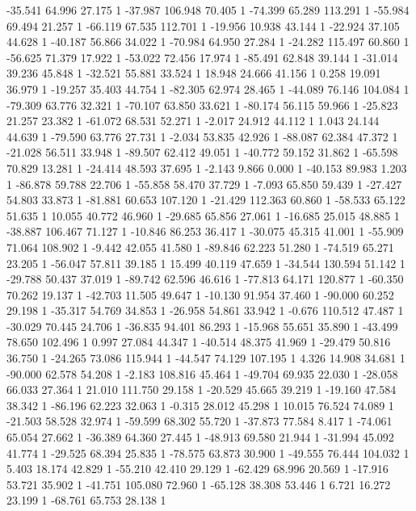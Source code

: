 	-35.541 64.996 27.175 1
	-37.987 106.948 70.405 1
	-74.399 65.289 113.291 1
	-55.984 69.494 21.257 1
	-66.119 67.535 112.701 1
	-19.956 10.938 43.144 1
	-22.924 37.105 44.628 1
	-40.187 56.866 34.022 1
	-70.984 64.950 27.284 1
	-24.282 115.497 60.860 1
	-56.625 71.379 17.922 1
	-53.022 72.456 17.974 1
	-85.491 62.848 39.144 1
	-31.014 39.236 45.848 1
	-32.521 55.881 33.524 1
	18.948 24.666 41.156 1
	0.258 19.091 36.979 1
	-19.257 35.403 44.754 1
	-82.305 62.974 28.465 1
	-44.089 76.146 104.084 1
	-79.309 63.776 32.321 1
	-70.107 63.850 33.621 1
	-80.174 56.115 59.966 1
	-25.823 21.257 23.382 1
	-61.072 68.531 52.271 1
	-2.017 24.912 44.112 1
	1.043 24.144 44.639 1
	-79.590 63.776 27.731 1
	-2.034 53.835 42.926 1
	-88.087 62.384 47.372 1
	-21.028 56.511 33.948 1
	-89.507 62.412 49.051 1
	-40.772 59.152 31.862 1
	-65.598 70.829 13.281 1
	-24.414 48.593 37.695 1
	-2.143 9.866 0.000 1
	-40.153 89.983 1.203 1
	-86.878 59.788 22.706 1
	-55.858 58.470 37.729 1
	-7.093 65.850 59.439 1
	-27.427 54.803 33.873 1
	-81.881 60.653 107.120 1
	-21.429 112.363 60.860 1
	-58.533 65.122 51.635 1
	10.055 40.772 46.960 1
	-29.685 65.856 27.061 1
	-16.685 25.015 48.885 1
	-38.887 106.467 71.127 1
	-10.846 86.253 36.417 1
	-30.075 45.315 41.001 1
	-55.909 71.064 108.902 1
	-9.442 42.055 41.580 1
	-89.846 62.223 51.280 1
	-74.519 65.271 23.205 1
	-56.047 57.811 39.185 1
	15.499 40.119 47.659 1
	-34.544 130.594 51.142 1
	-29.788 50.437 37.019 1
	-89.742 62.596 46.616 1
	-77.813 64.171 120.877 1
	-60.350 70.262 19.137 1
	-42.703 11.505 49.647 1
	-10.130 91.954 37.460 1
	-90.000 60.252 29.198 1
	-35.317 54.769 34.853 1
	-26.958 54.861 33.942 1
	-0.676 110.512 47.487 1
	-30.029 70.445 24.706 1
	-36.835 94.401 86.293 1
	-15.968 55.651 35.890 1
	-43.499 78.650 102.496 1
	0.997 27.084 44.347 1
	-40.514 48.375 41.969 1
	-29.479 50.816 36.750 1
	-24.265 73.086 115.944 1
	-44.547 74.129 107.195 1
	4.326 14.908 34.681 1
	-90.000 62.578 54.208 1
	-2.183 108.816 45.464 1
	-49.704 69.935 22.030 1
	-28.058 66.033 27.364 1
	21.010 111.750 29.158 1
	-20.529 45.665 39.219 1
	-19.160 47.584 38.342 1
	-86.196 62.223 32.063 1
	-0.315 28.012 45.298 1
	10.015 76.524 74.089 1
	-21.503 58.528 32.974 1
	-59.599 68.302 55.720 1
	-37.873 77.584 8.417 1
	-74.061 65.054 27.662 1
	-36.389 64.360 27.445 1
	-48.913 69.580 21.944 1
	-31.994 45.092 41.774 1
	-29.525 68.394 25.835 1
	-78.575 63.873 30.900 1
	-49.555 76.444 104.032 1
	5.403 18.174 42.829 1
	-55.210 42.410 29.129 1
	-62.429 68.996 20.569 1
	-17.916 53.721 35.902 1
	-41.751 105.080 72.960 1
	-65.128 38.308 53.446 1
	6.721 16.272 23.199 1
	-68.761 65.753 28.138 1
